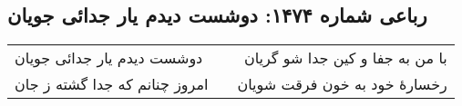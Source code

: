 \begin{center}
\section*{رباعی شماره ۱۴۷۴: دوشست دیدم یار جدائی جویان}
\label{sec:1474}
\begin{longtable}{l p{0.5cm} r}
دوشست دیدم یار جدائی جویان
&&
با من به جفا و کین جدا شو گریان
\\
امروز چنانم که جدا گشته ز جان
&&
رخسارهٔ خود به خون فرقت شویان
\\
\end{longtable}
\end{center}
